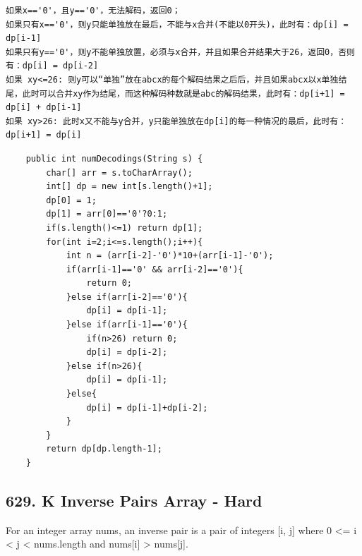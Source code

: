 \documentclass[9pt, b5paaper]{book}
\begin{document}
\begin{enumerate}
\begin{verbatim}
如果x=='0'，且y=='0'，无法解码，返回0；
如果只有x=='0'，则y只能单独放在最后，不能与x合并(不能以0开头)，此时有：dp[i] = dp[i-1]
如果只有y=='0'，则y不能单独放置，必须与x合并，并且如果合并结果大于26，返回0，否则有：dp[i] = dp[i-2]
如果 xy<=26: 则y可以“单独”放在abcx的每个解码结果之后后，并且如果abcx以x单独结尾，此时可以合并xy作为结尾，而这种解码种数就是abc的解码结果，此时有：dp[i+1] = dp[i] + dp[i-1]
如果 xy>26: 此时x又不能与y合并，y只能单独放在dp[i]的每一种情况的最后，此时有：dp[i+1] = dp[i]
\end{verbatim}
\begin{verbatim}
    public int numDecodings(String s) {
        char[] arr = s.toCharArray();
        int[] dp = new int[s.length()+1];
        dp[0] = 1;
        dp[1] = arr[0]=='0'?0:1;
        if(s.length()<=1) return dp[1];
        for(int i=2;i<=s.length();i++){
            int n = (arr[i-2]-'0')*10+(arr[i-1]-'0');
            if(arr[i-1]=='0' && arr[i-2]=='0'){
                return 0;
            }else if(arr[i-2]=='0'){
                dp[i] = dp[i-1];
            }else if(arr[i-1]=='0'){
                if(n>26) return 0;
                dp[i] = dp[i-2];
            }else if(n>26){
                dp[i] = dp[i-1];
            }else{
                dp[i] = dp[i-1]+dp[i-2];
            }
        }
        return dp[dp.length-1];
    }
\end{verbatim}
\end{enumerate}

\subsection{629. K Inverse Pairs Array - Hard}
\label{sec-1-4-61}
For an integer array nums, an inverse pair is a pair of integers [i, j] where 0 <= i < j < nums.length and nums[i] > nums[j].
\end{document}
